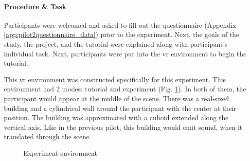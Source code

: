 \paragraph{Procedure \& Task}
Participants were welcomed and asked to fill out the questionnaire (Appendix \ref{app:pilot2questionnaire_data}) prior to the experiment. Next, the goals of the study, the project, and the tutorial were explained along with participant's individual task. Next, participants were put into the \gls{vr} environment to begin the tutorial.

This \gls{vr} environment was constructed specifically for this experiment. This environment had 2 modes: tutorial and experiment (Fig. \ref{fig:pilot2experiement_environment}). In both of them, the participant would appear at the middle of the scene. There was a real-sized building and a cylindrical wall around the participant with the center at their position. The building was approximated with a cuboid extended along the vertical axis. Like in the previous pilot, this building would emit sound, when it translated through the scene.
\begin{figure}
	\centering
	\par
	\par
	\caption{Experiment environment}
	\label{fig:pilot2experiement_environment}
\end{figure}

